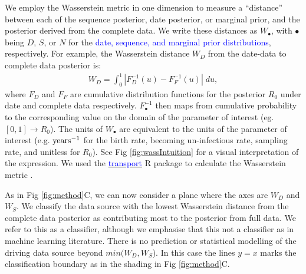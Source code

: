 \documentclass{article}
\begin{document}
We  employ the Wasserstein metric in one dimension to measure a ``distance'' between each of the sequence posterior, date posterior, or marginal prior, and the posterior derived from the complete data. We write these distances as $W_{\bullet}$, with $\bullet$ being $D$, $S$, or $N$ for the \textcolor{blue}{date, sequence, and marginal prior distributions}, respectively. For example, the Wasserstein distance $W_D$ from the date-data to complete data posterior is:
\begin{align*}
W_D = \int_0^1 |F_{D}^{-1}(u)-F_{F}^{-1}(u)| \; du, 
\end{align*}
where $F_{D}$ and $F_{F}$ are cumulative distribution functions for the posterior $R_{0}$ under date and complete data respectively. $F_{\bullet}^{-1}$ then maps from cumulative probability to the corresponding value on the domain of the parameter of interest (eg. $[0,1]\rightarrow R_{0}$). The units of $W_{\bullet}$ are equivalent to the units of the parameter of interest (e.g. $\textnormal{years}^{-1}$ for the birth rate, becoming un-infectious rate, sampling rate, and unitless for $R_{0}$). See Fig \ref{fig:wassIntuition} for a visual interpretation of the expression. We used the \href{https://www.rdocumentation.org/packages/transport/versions/0.12-2/topics/wasserstein1d}{\textcolor{blue}{transport}} R package to calculate the Wasserstein metric \citep{Schuhmacher2020computation}.

As in Fig \ref{fig:method}C, we can now consider a plane where the axes are $W_{D}$ and $W_{S}$. We classify the data source with the lowest Wasserstein distance from the complete data posterior as contributing most to the posterior from full data. We refer to this as a classifier, although we emphasise that this not a classifier as in machine learning literature. There is no prediction or statistical modelling of the driving data source beyond $min(W_{D}, W_{S}$). In this case the lines $y=x$ marks the classification boundary as in the shading in Fig \ref{fig:method}C. 
\end{document}
